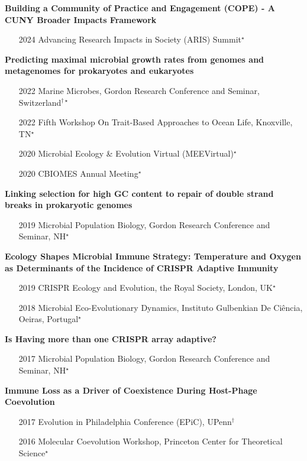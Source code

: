 \documentclass[]{res}
\begin{document}
\begin{resume}
 {\bf Building a Community of Practice and Engagement (COPE) - A CUNY Broader Impacts Framework}
 
 \begin{itemize}
 \item[2024] Advancing Research Impacts in Society (ARIS) Summit$^{\star}$
 \end{itemize}
 
 {\bf Predicting maximal microbial growth rates from genomes and metagenomes for prokaryotes and eukaryotes}
 
 \begin{itemize}
 \item[2022] Marine Microbes, Gordon Research Conference and Seminar, Switzerland$^{\dagger\star}$
 \item[2022] Fifth Workshop On Trait-Based Approaches to Ocean Life, Knoxville, TN$^{\star}$
 \item[2020] Microbial Ecology \& Evolution Virtual (MEEVirtual)$^{\star}$
 \item[2020] CBIOMES Annual Meeting$^{\star}$
 \end{itemize}
 
{\bf Linking selection for high GC content to repair of double strand breaks in prokaryotic genomes}

 \begin{itemize}
 \item[2019] Microbial Population Biology, Gordon Research Conference and Seminar, NH$^{\star}$
 \end{itemize} 
 
{\bf Ecology Shapes Microbial Immune Strategy: Temperature and Oxygen as Determinants of the Incidence of CRISPR Adaptive Immunity} 

 \begin{itemize}
 \item[2019] CRISPR Ecology and Evolution, the Royal Society, London, UK$^{\star}$
 \item[2018] Microbial Eco-Evolutionary Dynamics, Instituto Gulbenkian De Ci\^{e}ncia, Oeiras, Portugal$^{\star}$
 \end{itemize}
 
 {\bf Is Having more than one CRISPR array adaptive?}
 
 \begin{itemize}
 \item[2017] Microbial Population Biology, Gordon Research Conference and Seminar, NH$^{\star}$
 \end{itemize}
 
  {\bf Immune Loss as a Driver of Coexistence During Host-Phage Coevolution}
  
 \begin{itemize}
 \item[2017] Evolution in Philadelphia Conference (EPiC), UPenn$^{\dagger}$
 \item[2016] Molecular Coevolution Workshop, Princeton Center for Theoretical Science$^{\star}$
 \end{itemize}


\end{resume} 
\end{document}
